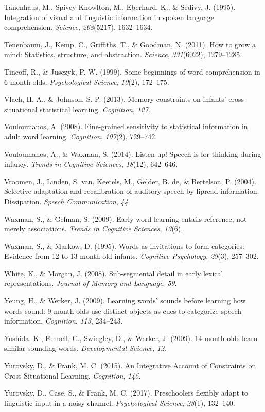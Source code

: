\documentclass[english,floatsintext,man]{apa6}
\theoremstyle{definition}
\theoremstyle{definition}
\theoremstyle{definition}
\theoremstyle{remark}
\begin{document}
\hypertarget{ref-Tanenhaus1995}{}
Tanenhaus, M., Spivey-Knowlton, M., Eberhard, K., \& Sedivy, J. (1995).
Integration of visual and linguistic information in spoken language
comprehension. \emph{Science}, \emph{268}(5217), 1632--1634.

\hypertarget{ref-tenenbaum11}{}
Tenenbaum, J., Kemp, C., Griffiths, T., \& Goodman, N. (2011). How to
grow a mind: Statistics, structure, and abstraction. \emph{Science},
\emph{331}(6022), 1279--1285.

\hypertarget{ref-tincoff1999}{}
Tincoff, R., \& Jusczyk, P. W. (1999). Some beginnings of word
comprehension in 6-month-olds. \emph{Psychological Science},
\emph{10}(2), 172--175.

\hypertarget{ref-vlach2013}{}
Vlach, H. A., \& Johnson, S. P. (2013). Memory constraints on infants'
cross-situational statistical learning. \emph{Cognition}, \emph{127}.

\hypertarget{ref-vouloumanos2008}{}
Vouloumanos, A. (2008). Fine-grained sensitivity to statistical
information in adult word learning. \emph{Cognition}, \emph{107}(2),
729--742.

\hypertarget{ref-vouloumanos2014}{}
Vouloumanos, A., \& Waxman, S. (2014). Listen up! Speech is for thinking
during infancy. \emph{Trends in Cognitive Sciences}, \emph{18}(12),
642--646.

\hypertarget{ref-vroomen2004}{}
Vroomen, J., Linden, S. van, Keetels, M., Gelder, B. de, \& Bertelson,
P. (2004). Selective adaptation and recalibration of auditory speech by
lipread information: Dissipation. \emph{Speech Communication},
\emph{44}.

\hypertarget{ref-waxman2009}{}
Waxman, S., \& Gelman, S. (2009). Early word-learning entails reference,
not merely associations. \emph{Trends in Cognitive Sciences},
\emph{13}(6).

\hypertarget{ref-waxman1995}{}
Waxman, S., \& Markow, D. (1995). Words as invitations to form
categories: Evidence from 12-to 13-month-old infants. \emph{Cognitive
Psychology}, \emph{29}(3), 257--302.

\hypertarget{ref-white2008b}{}
White, K., \& Morgan, J. (2008). Sub-segmental detail in early lexical
representations. \emph{Journal of Memory and Language}, \emph{59}.

\hypertarget{ref-yeung09}{}
Yeung, H., \& Werker, J. (2009). Learning words' sounds before learning
how words sound: 9-month-olds use distinct objects as cues to categorize
speech information. \emph{Cognition}, \emph{113}, 234--243.

\hypertarget{ref-yoshida2009}{}
Yoshida, K., Fennell, C., Swingley, D., \& Werker, J. (2009).
14-month-olds learn similar-sounding words. \emph{Developmental
Science}, \emph{12}.

\hypertarget{ref-yurovsky2015}{}
Yurovsky, D., \& Frank, M. C. (2015). An Integrative Account of
Constraints on Cross-Situational Learning. \emph{Cognition}, \emph{145}.

\hypertarget{ref-yurovsky2017}{}
Yurovsky, D., Case, S., \& Frank, M. C. (2017). Preschoolers flexibly
adapt to linguistic input in a noisy channel. \emph{Psychological
Science}, \emph{28}(1), 132--140.
\end{document}
